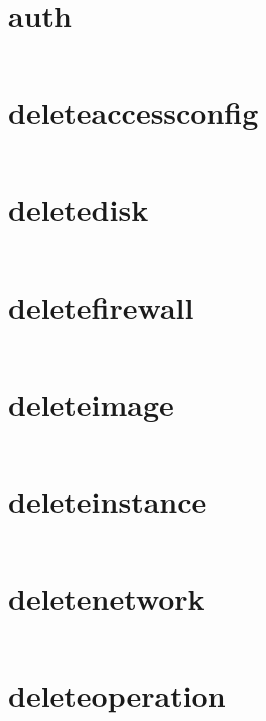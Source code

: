 \section{auth}
\begin{lstlisting}[language=Bash]
\end{lstlisting}

\section{deleteaccessconfig}
\begin{lstlisting}[language=Bash]
\end{lstlisting}

\section{deletedisk}
\begin{lstlisting}[language=Bash]
\end{lstlisting}

\section{deletefirewall}
\begin{lstlisting}[language=Bash]
\end{lstlisting}

\section{deleteimage}
\begin{lstlisting}[language=Bash]
\end{lstlisting}

\section{deleteinstance}
\begin{lstlisting}[language=Bash]
\end{lstlisting}

\section{deletenetwork}
\begin{lstlisting}[language=Bash]
\end{lstlisting}

\section{deleteoperation}
\begin{lstlisting}[language=Bash]
\end{lstlisting}

